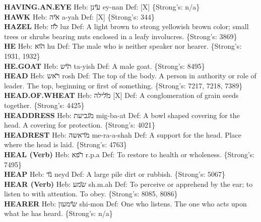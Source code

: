 {\textbf{HAVING.AN.EYE} Heb: {\large\H עינן} ey-nan Def: {[}X{]} \{Strong's: n/a\}\hfill{}\\

\textbf{HAWK} Heb: {\large\H איה} a-yah Def: {[}X{]} \{Strong's: 344\}\hfill{}\\

\textbf{HAZEL} Heb: {\large\H לוז} luz Def: A light brown to strong yellowish brown color; small trees or shrubs bearing nuts enclosed in a leafy involucres. \{Strong's: 3869\}\hfill{}\\

\textbf{HE} Heb: {\large\H הוא} hu Def: The male who is neither speaker nor hearer. \{Strong's: 1931, 1932\}\hfill{}\\

\textbf{HE.GOAT} Heb: {\large\H תיש} ta-yish Def: A male goat. \{Strong's: 8495\}\hfill{}\\

\textbf{HEAD} Heb: {\large\H ראש} rosh Def: The top of the body. A person in authority or role of leader. The top, beginning or first of something. \{Strong's: 7217, 7218, 7389\}\hfill{}\\

\textbf{HEAD.OF.WHEAT} Heb: {\large\H מלילה} {[}X{]} Def: A conglomeration of grain seeds together. \{Strong's: 4425\}\hfill{}\\

\textbf{HEADDRESS} Heb: {\large\H מגביעת} mig-ba-at Def: A bowl shaped covering for the head. A covering for protection. \{Strong's: 4021\}\hfill{}\\

\textbf{HEADREST} Heb: {\large\H מראשה} me-ra-a-shah Def: A support for the head. Place where the head is laid. \{Strong's: 4763\}\hfill{}\\

\textbf{HEAL (Verb)} Heb: {\large\H רפא} r.p.a Def: To restore to health or wholeness. \{Strong's: 7495\}\hfill{}\\

\textbf{HEAP} Heb: {\large\H נד} neyd Def: A large pile dirt or rubbish. \{Strong's: 5067\}\hfill{}\\

\textbf{HEAR (Verb)} Heb: {\large\H שמע} sh.m.ah Def: To perceive or apprehend by the ear; to listen to with attention. To obey. \{Strong's: 8085, 8086\}\hfill{}\\

\textbf{HEARER} Heb: {\large\H שימעון} shi-mon Def: One who listens. The one who acts upon what he has heard. \{Strong's: n/a\}\hfill{}\\

}
